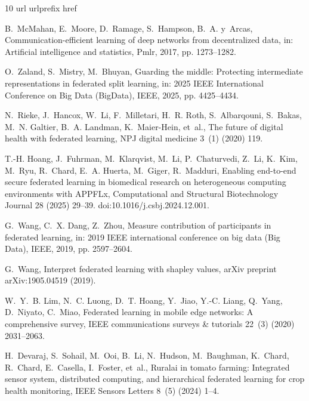 \documentclass[preprint,12pt, a4paper]{elsarticle}
\begin{document}
\begin{thebibliography}{10}
\expandafter\ifx\csname url\endcsname\relax
  \def\url#1{\texttt{#1}}\fi
\expandafter\ifx\csname urlprefix\endcsname\relax\def\urlprefix{URL }\fi
\expandafter\ifx\csname href\endcsname\relax
  \def\href#1#2{#2} \def\path#1{#1}\fi

B.~McMahan, E.~Moore, D.~Ramage, S.~Hampson, B.~A. y~Arcas, Communication-efficient learning of deep networks from decentralized data, in: Artificial intelligence and statistics, Pmlr, 2017, pp. 1273--1282.

O.~Zaland, S.~Mistry, M.~Bhuyan, Guarding the middle: Protecting intermediate representations in federated split learning, in: 2025 IEEE International Conference on Big Data (BigData), IEEE, 2025, pp. 4425--4434.

N.~Rieke, J.~Hancox, W.~Li, F.~Milletari, H.~R. Roth, S.~Albarqouni, S.~Bakas, M.~N. Galtier, B.~A. Landman, K.~Maier-Hein, et~al., The future of digital health with federated learning, NPJ digital medicine 3~(1) (2020) 119.

T.-H. Hoang, J.~Fuhrman, M.~Klarqvist, M.~Li, P.~Chaturvedi, Z.~Li, K.~Kim, M.~Ryu, R.~Chard, E.~A. Huerta, M.~Giger, R.~Madduri, Enabling end-to-end secure federated learning in biomedical research on heterogeneous computing environments with {APPFLx}, Computational and Structural Biotechnology Journal 28 (2025) 29--39. \href{https://doi.org/10.1016/j.csbj.2024.12.001}{doi:10.1016/j.csbj.2024.12.001}.

G.~Wang, C.~X. Dang, Z.~Zhou, Measure contribution of participants in federated learning, in: 2019 IEEE international conference on big data (Big Data), IEEE, 2019, pp. 2597--2604.

G.~Wang, Interpret federated learning with shapley values, arXiv preprint arXiv:1905.04519 (2019).

W.~Y.~B. Lim, N.~C. Luong, D.~T. Hoang, Y.~Jiao, Y.-C. Liang, Q.~Yang, D.~Niyato, C.~Miao, Federated learning in mobile edge networks: A comprehensive survey, IEEE communications surveys \& tutorials 22~(3) (2020) 2031--2063.

H.~Devaraj, S.~Sohail, M.~Ooi, B.~Li, N.~Hudson, M.~Baughman, K.~Chard, R.~Chard, E.~Casella, I.~Foster, et~al., Ruralai in tomato farming: Integrated sensor system, distributed computing, and hierarchical federated learning for crop health monitoring, IEEE Sensors Letters 8~(5) (2024) 1--4.


\end{thebibliography}
\end{document}
